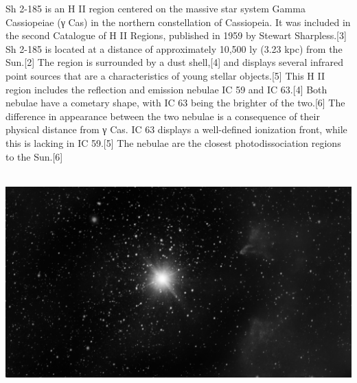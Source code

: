 {\footnotesize\color{white}
Sh 2-185 is an H II region centered on the massive star system Gamma Cassiopeiae (γ Cas) in the northern constellation of Cassiopeia. It was included in the second Catalogue of H II Regions, published in 1959 by Stewart Sharpless.[3] Sh 2-185 is located at a distance of approximately 10,500 ly (3.23 kpc) from the Sun.[2] The region is surrounded by a dust shell,[4] and displays several infrared point sources that are a characteristics of young stellar objects.[5] This H II region includes the reflection and emission nebulae IC 59 and IC 63.[4] Both nebulae have a cometary shape, with IC 63 being the brighter of the two.[6] The difference in appearance between the two nebulae is a consequence of their physical distance from γ Cas. IC 63 displays a well-defined ionization front, while this is lacking in IC 59.[5] The nebulae are the closest photodissociation regions to the Sun.[6]


}\ \\
\includegraphics[width=\textwidth]{../Imaging//Grayscale/Ghost_Of_Cassiopeia.jpg}
